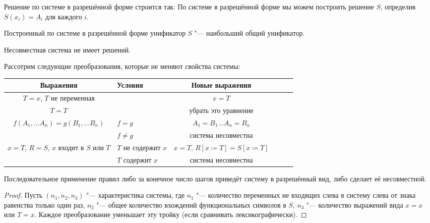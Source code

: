 Решение по системе в разрешённой форме строится так:
По системе в разрешённой форме мы можем построить решение $S$, определив $S(x_i) = A_i$ для каждого $i$.
\todo

\begin{statement}
    Построенный по системе в разрешённой форме унификатор $S$ "--- наибольший общий унификатор.
\end{statement}

\begin{statement}
    Несовместная система не имеет решений.
\end{statement}

Рассотрим следующие преобразования, которые не меняют свойства системы:
\begin{center}
\begin{tabular}{Sl Sl Sl}
    Выражения                         & Условия             & Новые выражения \\ \hline
    $T=x$, $T$ не переменная          &                     & $x=T$ \\ \hline
    $T=T$                             &                     & убрать это уравнение \\ \hline
    $f(A_1, \ldots A_n) = g(B_1, \ldots B_n)$
                                      & $f=g$               & $ A_1 = B_1 \ldots A_n = B_n$ \\ 
                                      & $f \neq g$          & система несовместна \\ \hline
    $x=T$, $R=S$, $x$ входит в $S$ или $T$
                                      & $T$ не содержит $x$ & $x=T$, $R\left[x\coloneqq T\right]=S\left[x\coloneqq T\right]$ \\ 
                                      & $T$ содержит $x$    & система несовместна \\ \hline
\end{tabular}
\end{center}

\begin{statement}
    Последовательное применение правил либо за конечное число шагов приведёт систему в разрешённый вид, либо сделает её несовместной.
\end{statement}

\begin{proof} \todo
    Пусть $(n_1, n_2, n_3)$ "--- характеристика системы, где
    $n_1$ "--- количество переменных не входящих слева в систему слева от знака равенства только один раз,
    $n_2$ "--- общее количество вхождений функциональных символов в $S$,
    $n_3$ "--- количество выражений вида $x=x$ или $T=x$.
    Каждое преобразование уменьшает эту тройку (если сравнивать лексикографически).
\end{proof}

